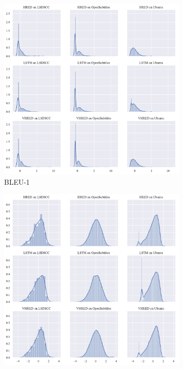 \begin{figure}[H]
    \centering
    \begin{subfigure}{0.33\linewidth}
        \centering
        \includegraphics[width=\linewidth]{figure/distplot_grid/bleu_1/plot.pdf}
        \caption{BLEU-1}
    \end{subfigure}%
    \begin{subfigure}{0.33\linewidth}
        \includegraphics[width=\linewidth]{figure/distplot_grid/embedding_based_vector_average/plot.pdf}

\end{subfigure}
\end{figure}
